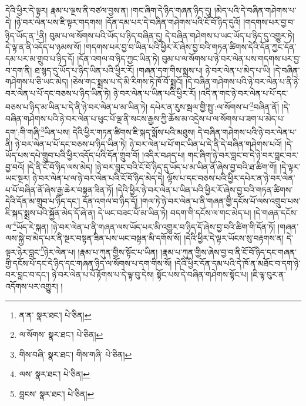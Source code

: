 དེའི་ཕྱིར་དེ་ལྟར། རྣམ་པ་ལྔས་ནི་བཙལ་བྱས་ན། །གང་ཞིག་དེ་ཉིད་གཞན་ཉིད་དུ། །མེད་པའི་དེ་བཞིན་གཤེགས་པ་དེ། །ཉེ་བར་ལེན་པས་ཇི་ལྟར་གདགས། །དོན་དམ་པར་དེ་བཞིན་གཤེགས་པའི་ངོ་བོ་ཉིད་དུའོ། །གདགས་པར་བྱ་བ་ཉིད་ཡོད་ན་\footnote{ན་ན་  སྣར་ཐང་།  པེ་ཅིན། }ནི། བུམ་པ་ལ་སོགས་པའི་ཡོད་པ་ཉིད་བཞིན་དུ། དེ་བཞིན་གཤེགས་པ་ཡང་ཡོད་པ་ཉིད་དུ་འགྱུར་ཏེ། དེ་ལྟ་ན་ནི་འདོད་པ་ཉམས་སོ། །གདགས་པར་བྱ་བ་ཡིན་པའི་ཕྱིར་རོ་ཞེས་བྱ་བའི་གཏན་ཚིགས་དེའི་དོན་ཀྱང་དོན་དམ་པར་མ་གྲུབ་པ་ཉིད་དོ། །དོན་འགལ་བ་ཉིད་ཀྱང་ཡིན་ཏེ། བུམ་པ་ལ་སོགས་པ་ཉེ་བར་ལེན་པས་གདགས་པར་བྱ་བ་དག་ནི། ཐ་སྙད་དུ་ཡོད་པ་ཉིད་ཡིན་པའི་ཕྱིར་རོ། །གཞན་དག་གིས་སྨྲས་པ། ཉེ་བར་ལེན་པ་མེད་པ་ཡི། །དེ་བཞིན་གཤེགས་པ་ཅི་ཡང་མེད། །ཅེས་གང་སྨྲས་པ་དེ་མི་རིགས་ཏེ་ཁོ་བོ་སྨྲའོ། །དེ་བཞིན་གཤེགས་པའི་ཉེ་བར་ལེན་པ་ནི་ཉེ་བར་ལེན་པ་པོ་དང་བཅས་པ་ཉིད་ཡིན་ཏེ། ཉེ་བར་ལེན་པ་ཡིན་པའི་ཕྱིར་རོ། །འདི་ན་གང་ཉེ་བར་ལེན་པ་པོ་དང་བཅས་པ་ཉིད་མ་ཡིན་པ་དེ་ནི་ཉེ་བར་ལེན་པ་མ་ཡིན་ཏེ། དཔེར་ན་རུས་སྦལ་གྱི་སྤུ་:ལ་སོགས་པ་\footnote{ལ་སོགས་  སྣར་ཐང་།  པེ་ཅིན། }བཞིན་ནོ། །དེ་བཞིན་གཤེགས་པའི་ཉེ་བར་ལེན་པ་ཕུང་པོ་ལྔ་ནི་སངས་རྒྱས་ཀྱི་ཆོས་མ་འདྲེས་པ་ལ་སོགས་པ་ཟག་པ་མེད་པ་དག་:གི་གཞི་\footnote{གིས་བཞི་  སྣར་ཐང་། གིས་གཞི་  པེ་ཅིན། }ཡིན་པས། དེའི་ཕྱིར་གཏན་ཚིགས་ཇི་སྐད་སྨོས་པའི་མཐུས། དེ་བཞིན་གཤེགས་པའི་ཉེ་བར་ལེན་པ་ནི། ཉེ་བར་ལེན་པ་པོ་དང་བཅས་པ་ཉིད་ཡིན་ཏེ། ཉེ་བར་ལེན་པ་པོ་གང་ཡིན་པ་དེ་ནི་དེ་བཞིན་གཤེགས་པའོ། །དེ་ཡོད་པས་དཔེ་གྲུབ་པའི་ཕྱིར་འདོད་པའི་དོན་གྲུབ་བོ། །འདིར་བཤད་པ། གང་ཞིག་ཉེ་བར་བླང་བ་དེ་ཉེ་བར་བླང་བར་བྱ་བའོ། །དེ་ནི་ངོ་བོ་ཉིད་ལས་མེད། །ཉེ་བར་བླང་བའི་ངོ་བོ་ཉིད་དུ་ཡོད་པ་མ་ཡིན་ནོ་ཞེས་བྱ་བའི་ཐ་ཚིག་གོ། །དེ་ལྟར་ཡང་སྔར། ཉེ་བར་ལེན་པ་ལ་ཉེ་བར་ལེན་པའི་ངོ་བོ་ཉིད་མེད་དེ། ལྟོས་པ་དང་བཅས་པའི་ཕྱིར་དཔེར་ན་ཉེ་བར་ལེན་པ་པོ་བཞིན་ནོ་ཞེས་རྒྱ་ཆེར་བསྟན་ཟིན་ཏོ། །དེའི་ཕྱིར་ཉེ་བར་ལེན་པ་ཡིན་པའི་ཕྱིར་རོ་ཞེས་བྱ་བའི་གཏན་ཚིགས་དེའི་དོན་མ་གྲུབ་པ་ཉིད་དང་། དོན་འགལ་བ་ཉིད་དོ། །གལ་ཏེ་ཉེ་བར་ལེན་པ་ནི་གཞན་གྱི་དངོས་པོ་ལས་འགྲུབ་པས་ཇི་སྐད་སྨྲས་པའི་སྐྱོན་མེད་དོ་ཞེ་ན། དེ་ཡང་བཟང་པོ་མ་ཡིན་ཏེ། བདག་གི་དངོས་ལ་གང་མེད་པ། །དེ་གཞན་དངོས་ལ་\footnote{ལས་  སྣར་ཐང་།  པེ་ཅིན། }ཡོད་རེ་སྐན། །ཉེ་བར་ལེན་པ་ནི་གཞན་ལས་ཡོད་པར་མི་འགྱུར་བ་ཉིད་དོ་ཞེས་བྱ་བའི་ཚིག་གི་དོན་ཏོ། །གཞན་ལས་སྐྱེ་བ་མེད་པར་ནི་སྔར་བསྟན་ཟིན་པས་ཡང་བསྟན་མི་དགོས་སོ། །དེའི་ཕྱིར་དེ་ལྟར་ཡོངས་སུ་བརྟགས་ན། དེ་ལྟར་ཉེར་བླང་\footnote{བླངས་  སྣར་ཐང་།  པེ་ཅིན། }ཉེར་ལེན་པ། །རྣམ་པ་ཀུན་གྱིས་སྟོང་པ་ཡིན། །རྣམ་པ་ཀུན་གྱིས་ཞེས་བྱ་བ་ནི་ངོ་བོ་ཉིད་དང་གཞན་གྱི་དངོས་པོ་དང་དེ་ཉིད་དང་གཞན་ཉིད་ལ་སོགས་པ་དག་གིས་སོ། །དེའི་ཕྱིར་དོན་དམ་པའི་དེ་ཁོ་ན་མཐོང་བ་དག་ཉེ་བར་བླང་བ་དང་། ཉེ་བར་ལེན་པ་པོ་རྟོགས་པ་དེ་ལྟ་བུ་དེས། སྟོང་པས་དེ་བཞིན་གཤེགས་སྟོང་པ། །ཇི་ལྟ་བུར་ན་འདོགས་པར་འགྱུར། །
